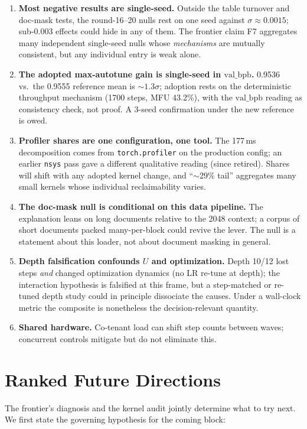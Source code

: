 \documentclass{article}
\newcommand{\valbpb}{\mathrm{val\_bpb}}
\begin{document}
\begin{enumerate}
    \item \textbf{Most negative results are single-seed.} Outside the table turnover and doc-mask tests, the round-16--20 nulls rest on one seed against $\sigma \approx 0.0015$; sub-$0.003$ effects could hide in any of them. The frontier claim F7 aggregates many independent single-seed nulls whose \emph{mechanisms} are mutually consistent, but any individual entry is weak alone.
    \item \textbf{The adopted max-autotune gain is single-seed in $\valbpb$.} 0.9536 vs.\ the 0.9555 reference mean is $\sim 1.3\sigma$; adoption rests on the deterministic throughput mechanism (1700 steps, MFU 43.2\%), with the $\valbpb$ reading as consistency check, not proof. A 3-seed confirmation under the new reference is owed.
    \item \textbf{Profiler shares are one configuration, one tool.} The 177\,ms decomposition comes from \texttt{torch.profiler} on the production config; an earlier \texttt{nsys} pass gave a different qualitative reading (since retired). Shares will shift with any adopted kernel change, and ``$\sim$29\% tail'' aggregates many small kernels whose individual reclaimability varies.
    \item \textbf{The doc-mask null is conditional on this data pipeline.} The explanation leans on long documents relative to the 2048 context; a corpus of short documents packed many-per-block could revive the lever. The null is a statement about this loader, not about document masking in general.
    \item \textbf{Depth falsification confounds $U$ and optimization.} Depth 10/12 lost steps \emph{and} changed optimization dynamics (no LR re-tune at depth); the interaction hypothesis is falsified at this frame, but a step-matched or re-tuned depth study could in principle dissociate the causes. Under a wall-clock metric the composite is nonetheless the decision-relevant quantity.
    \item \textbf{Shared hardware.} Co-tenant load can shift step counts between waves; concurrent controls mitigate but do not eliminate this.
\end{enumerate}

\section{Ranked Future Directions}
\label{sec:future}

The frontier's diagnosis and the kernel audit jointly determine what to try next. We first state the governing hypothesis for the coming block:
\end{document}

